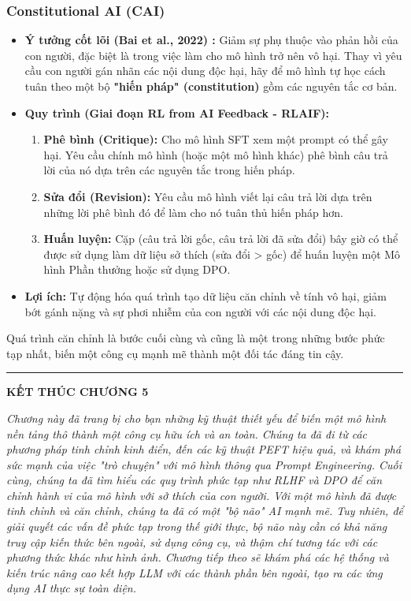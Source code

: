 \subsubsection{Constitutional AI (CAI)}
\begin{itemize}
    \item \textbf{Ý tưởng cốt lõi (Bai et al., 2022) \cite{bai2022constitutional}:} Giảm sự phụ thuộc vào phản hồi của con người, đặc biệt là trong việc làm cho mô hình trở nên vô hại. Thay vì yêu cầu con người gán nhãn các nội dung độc hại, hãy để mô hình tự học cách tuân theo một bộ \textbf{"hiến pháp" (constitution)} gồm các nguyên tắc cơ bản.
    \item \textbf{Quy trình (Giai đoạn RL from AI Feedback - RLAIF):}
        \begin{enumerate}
            \item \textbf{Phê bình (Critique):} Cho mô hình SFT xem một prompt có thể gây hại. Yêu cầu chính mô hình (hoặc một mô hình khác) phê bình câu trả lời của nó dựa trên các nguyên tắc trong hiến pháp.
            \item \textbf{Sửa đổi (Revision):} Yêu cầu mô hình viết lại câu trả lời dựa trên những lời phê bình đó để làm cho nó tuân thủ hiến pháp hơn.
            \item \textbf{Huấn luyện:} Cặp (câu trả lời gốc, câu trả lời đã sửa đổi) bây giờ có thể được sử dụng làm dữ liệu sở thích (sửa đổi > gốc) để huấn luyện một Mô hình Phần thưởng hoặc sử dụng DPO.
        \end{enumerate}
    \item \textbf{Lợi ích:} Tự động hóa quá trình tạo dữ liệu căn chỉnh về tính vô hại, giảm bớt gánh nặng và sự phơi nhiễm của con người với các nội dung độc hại.
\end{itemize}

Quá trình căn chỉnh là bước cuối cùng và cũng là một trong những bước phức tạp nhất, biến một công cụ mạnh mẽ thành một đối tác đáng tin cậy.

\bigskip
\hrule
\bigskip

\begin{center}
    \textbf{\Large KẾT THÚC CHƯƠNG 5}
\end{center}

\textit{Chương này đã trang bị cho bạn những kỹ thuật thiết yếu để biến một mô hình nền tảng thô thành một công cụ hữu ích và an toàn. Chúng ta đã đi từ các phương pháp tinh chỉnh kinh điển, đến các kỹ thuật PEFT hiệu quả, và khám phá sức mạnh của việc "trò chuyện" với mô hình thông qua Prompt Engineering. Cuối cùng, chúng ta đã tìm hiểu các quy trình phức tạp như RLHF và DPO để căn chỉnh hành vi của mô hình với sở thích của con người. Với một mô hình đã được tinh chỉnh và căn chỉnh, chúng ta đã có một "bộ não" AI mạnh mẽ. Tuy nhiên, để giải quyết các vấn đề phức tạp trong thế giới thực, bộ não này cần có khả năng truy cập kiến thức bên ngoài, sử dụng công cụ, và thậm chí tương tác với các phương thức khác như hình ảnh. Chương tiếp theo sẽ khám phá các hệ thống và kiến trúc nâng cao kết hợp LLM với các thành phần bên ngoài, tạo ra các ứng dụng AI thực sự toàn diện.}
